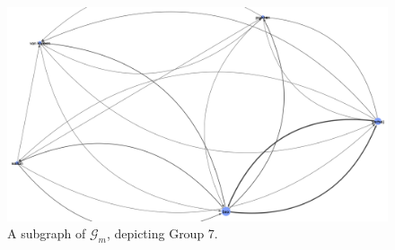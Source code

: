\documentclass[11pt,a4paper]{book}
\theoremstyle{definition}
\theoremstyle{definition}
\theoremstyle{definition}
\theoremstyle{remark}
\newcommand{\acgraph}{\mathcal{G}_{m}}
\begin{document}
\begin{figure}
\includegraphics[width=\textwidth]{mgraph_group_7.png}
\caption{A subgraph of $\acgraph$, depicting Group 7.}
\label{fig:mgraph-community-7}
\end{figure}
\end{document}
